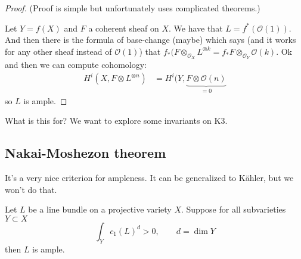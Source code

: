 \begin{proof}\leavevmode
	(Proof is simple but unfortunately uses complicated theorems.)

	Let $Y=f(X)$ and $F$ a coherent sheaf on $X$. We have that $L=f^*(\mathcal{O}(1))$. And then there is the formula of base-change (maybe) which says (and it works for any other sheaf instead of $\mathcal{O}(1)$) that $f_*(F\otimes_{\mathcal{O}_X}L^{\otimes k}=f_* F\otimes_{\mathcal{O}_Y}\mathcal{O}(k)$. Ok and then we can compute cohomology:
	\begin{align*}
		H^{i}(X,F\otimes L^{\otimes n})&=H^{i}(Y,\underbrace{F\otimes \mathcal{O}(n)}_{=0}
	\end{align*}
	so $L$ is ample.
\end{proof}

What is this for? We want to explore some invariants on K3.

\subsection{Nakai-Moshezon theorem}

It's a very nice criterion for ampleness. It can be generalized to Kähler, but we won't do that.

\begin{thm}\leavevmode
	Let $L$ be a line bundle on a projective variety $X$. Suppose for all subvarieties $Y\subset X$
	\[\int_{Y}c_1(L)^d>0,\qquad d=\dim Y\]
	then $L$ is ample.
\end{thm}

